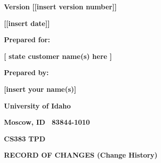 \bigskip


\bigskip


\bigskip


\bigskip

{\centering{}\bfseries\color{black}
Version [[insert version number]]
\par}

{\centering{}\bfseries\color{black}
[[insert date]]
\par}


\bigskip


\bigskip

{\centering{}\bfseries\color{black}
Prepared for:
\par}

{\centering{}\bfseries\color{black}
[ state customer name(s) here ]
\par}


\bigskip


\bigskip

{\centering{}\bfseries\color{black}
Prepared by:
\par}

{\centering{}\bfseries\color{black}
[insert your name(s)]
\par}

{\centering{}\bfseries\color{black}
University of Idaho
\par}

{\centering{}\bfseries\color{black}
Moscow, ID \ 83844-1010
\par}

{\centering{}\bfseries\color{black}
CS383 TPD
\par}

\pagebreak

{\centering{}\bfseries\color{black}
RECORD OF CHANGES (Change History)
\par}

